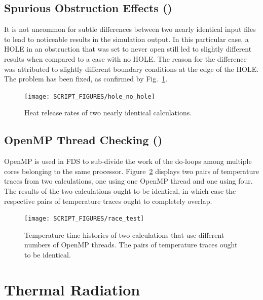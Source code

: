 \documentclass[11pt]{book}
\begin{document}
\section{Spurious Obstruction Effects (\texorpdfstring{}{hole})}
\label{hole}

It is not uncommon for subtle differences between two nearly identical input files to lead to noticeable results in the simulation output. In this particular case, a {\ct HOLE} in an obstruction that was set to never open still led to slightly different results when compared to a case with no {\ct HOLE}. The reason for the difference was attributed to slightly different boundary conditions at the edge of the {\ct HOLE}. The problem has been fixed, as confirmed by Fig.~\ref{hole_fig}.

\begin{figure}[!ht]
\centering
\texttt{[image: SCRIPT\_FIGURES/hole\_no\_hole]}
\caption[Results of the  test case]{Heat release rates of two nearly identical calculations.}
\label{hole_fig}
\end{figure}


\section{OpenMP Thread Checking (\texorpdfstring{}{race\_test})}
\label{race_test}

OpenMP is used in FDS to sub-divide the work of the do-loops among multiple cores belonging to the same processor. Figure~\ref{race_test_fig} displays two pairs of temperature traces from two calculations, one using one OpenMP thread and one using four. The results of the two calculations ought to be identical, in which case the respective pairs of temperature traces ought to completely overlap.

\begin{figure}[!ht]
\centering
\texttt{[image: SCRIPT\_FIGURES/race\_test]}
\caption[Result of the ]{Temperature time histories of two calculations that use different numbers of OpenMP threads. The pairs of temperature traces ought to be identical.}
\label{race_test_fig}
\end{figure}



\chapter{Thermal Radiation}
\end{document}
